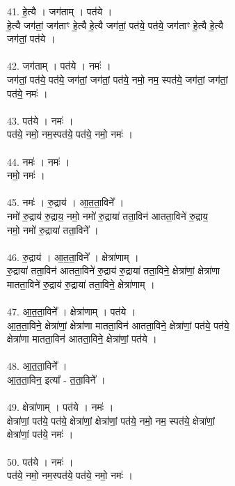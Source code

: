 41. हे॒त्यै । जग॑ताम् । पत॑ये ।\\
हे॒त्यै जग॑तां॒ जग॑ताꣳ हे॒त्यै हे॒त्यै जग॑तां॒ पत॑ये॒ पत॑ये॒ जग॑ताꣳ हे॒त्यै हे॒त्यै\\
जग॑तां॒ पत॑ये ।\\
\\
42. जग॑ताम् । पत॑ये । नमः॑ ।\\
जग॑तां॒ पत॑ये॒ पत॑ये॒ जग॑तां॒ जग॑तां॒ पत॑ये॒ नमो॒ नम॒ स्पत॑ये॒ जग॑तां॒ जग॑तां॒\\
पत॑ये॒ नमः॑ ।\\
\\
43. पत॑ये । नमः॑ ।\\
पत॑ये॒ नमो॒ नम॒स्पत॑ये॒ पत॑ये॒ नमो॒ नमः॑ ।\\
\\
44. नमः॑ । नमः॑ ।\\
नमो॒ नमः॑ ।\\
\\
45. नमः॑ । रु॒द्राय॑ । आ॒त॒ता॒विने᳚ ।\\
नमो॑ रु॒द्राय॑ रु॒द्राय॒ नमो॒ नमो॑ रु॒द्राया॑ तता॒विन॑ आतता॒विने॑ रु॒द्राय॒\\
नमो॒ नमो॑ रु॒द्राया॑ तता॒विने᳚ ।\\
\\
46. रु॒द्राय॑ । आ॒त॒ता॒विने᳚ । क्षेत्रा॑णाम् ।\\
रु॒द्राया॑ तता॒विन॑ आतता॒विने॑ रु॒द्राय॑ रु॒द्राया॑ तता॒विने॒ क्षेत्रा॑णां॒ क्षेत्रा॑णा\\
मातता॒विने॑ रु॒द्राय॑ रु॒द्राया॑ तता॒विने॒ क्षेत्रा॑णाम् ।\\
\\
47. आ॒त॒ता॒विने᳚ । क्षेत्रा॑णाम् । पत॑ये ।\\
आ॒त॒ता॒विने॒ क्षेत्रा॑णां॒ क्षेत्रा॑णा मातता॒विन॑ आतता॒विने॒ क्षेत्रा॑णां॒ पत॑ये॒ पत॑ये॒\\
क्षेत्रा॑णा मातता॒विन॑ आतता॒विने॒ क्षेत्रा॑णां॒ पत॑ये ।\\
\\
48. आ॒त॒ता॒विने᳚ ।\\
आ॒त॒ता॒विन॒ इत्या᳚ - त॒ता॒विने᳚ ।\\
\\
49. क्षेत्रा॑णाम् । पत॑ये । नमः॑ ।\\
क्षेत्रा॑णां॒ पत॑ये॒ पत॑ये॒ क्षेत्रा॑णां॒ क्षेत्रा॑णां॒ पत॑ये॒ नमो॒ नम॒ स्पत॑ये॒ क्षेत्रा॑णां॒\\
क्षेत्रा॑णां॒ पत॑ये॒ नमः॑ ।\\
\\
50. पत॑ये । नमः॑ ।\\
पत॑ये॒ नमो॒ नम॒स्पत॑ये॒ पत॑ये॒ नमो॒ नमः॑ ।\\
